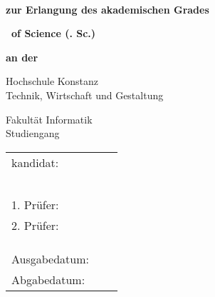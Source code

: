 \begin{titlepage}

\AddToShipoutPicture*{\BackgroundImgTitelPage}

\vspace*{\bigskipamount}


{\makeatletter
\fboxsep=0pt
\colorbox{htwg-white}{\begin{minipage}[t]{145mm}
    \begin{center}
        \color{black}\Huge{\@report@typetext}
        \\
        \color{black}\Huge\textbf{\@title}
    \end{center}
\end{minipage}}
\makeatother}

\bigskip
\bigskip

{
\setlength{\parskip}{0.5cm}
\begin{center}
	\textbf{zur Erlangung des akademischen Grades}
	
	\textbf{\Large \type\ of Science (\typeshortcut. Sc.)}
	
	\textbf{an der}
	
	\textsf{\huge Hochschule Konstanz}\\
	{\small Technik, Wirtschaft und Gestaltung}
	
    \textsf{\Large Fakultät Informatik} \\
	Studiengang \studiengang
	
\end{center}
}

\bigskip
\bigskip
\bigskip

\begin{center}
	\begingroup
	\renewcommand*{\arraystretch}{1}
	{\makeatletter
		\begin{tabular}{lll}
			\type kandidat: & \verfasser \\
							& \strasse \\
							& \wohnort \\ \\ \\ \\
	
			1. Prüfer: & \prueferA \\
			2. Prüfer: & \prueferB \\ \\ \\ \\
			
			Ausgabedatum: & \ausgabedatum \\
			Abgabedatum: & \abgabedatum
		\end{tabular}
		\makeatother}
	\endgroup
\end{center}


\end{titlepage}


